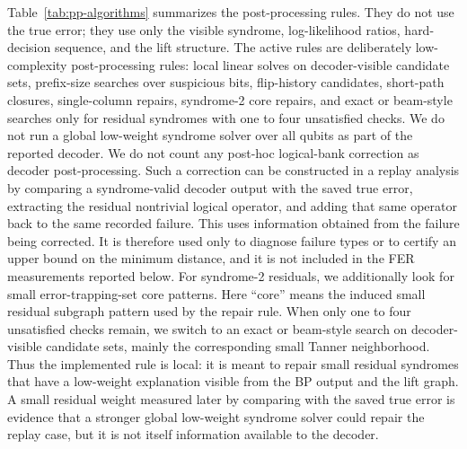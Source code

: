 \documentclass[11pt,a4paper]{article}
\theoremstyle{uprighttheorem}
\begin{document}
Table~\ref{tab:pp-algorithms} summarizes the post-processing rules.
They do not use the true error; they use only the visible syndrome, log-likelihood ratios, hard-decision sequence, and the lift structure.
The active rules are deliberately low-complexity post-processing rules: local linear solves on decoder-visible candidate sets, prefix-size searches over suspicious bits, flip-history candidates, short-path closures, single-column repairs, syndrome-2 core repairs, and exact or beam-style searches only for residual syndromes with one to four unsatisfied checks.
We do not run a global low-weight syndrome solver over all qubits as part of the reported decoder.
We do not count any post-hoc logical-bank correction as decoder post-processing.
Such a correction can be constructed in a replay analysis by comparing a syndrome-valid decoder output with the saved true error, extracting the residual nontrivial logical operator, and adding that same operator back to the same recorded failure.
This uses information obtained from the failure being corrected.
It is therefore used only to diagnose failure types or to certify an upper bound on the minimum distance, and it is not included in the FER measurements reported below.
For syndrome-2 residuals, we additionally look for small error-trapping-set core patterns.
Here ``core'' means the induced small residual subgraph pattern used by the repair rule.
When only one to four unsatisfied checks remain, we switch to an exact or beam-style search on decoder-visible candidate sets, mainly the corresponding small Tanner neighborhood.
Thus the implemented rule is local: it is meant to repair small residual syndromes that have a low-weight explanation visible from the BP output and the lift graph.
A small residual weight measured later by comparing with the saved true error is evidence that a stronger global low-weight syndrome solver could repair the replay case, but it is not itself information available to the decoder.
\end{document}
